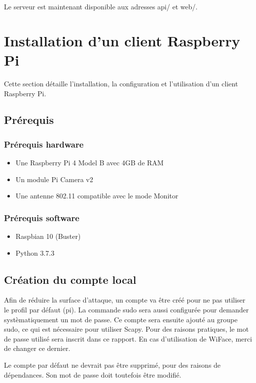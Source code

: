 Le serveur est maintenant disponible aux adresses api/ et web/.

\section{Installation d'un client Raspberry Pi}
Cette section détaille l'installation, la configuration et l'utilisation d'un client Raspberry Pi.

\subsection{Prérequis}

\subsubsection{Prérequis hardware}
\begin{itemize}
    \item Une Raspberry Pi 4 Model B avec 4GB de RAM
    \item Un module Pi Camera v2
    \item Une antenne 802.11 compatible avec le mode Monitor
\end{itemize}

\subsubsection{Prérequis software}
\begin{itemize}
    \item Raspbian 10 (Buster)
    \item Python 3.7.3
\end{itemize}

\subsection{Création du compte local}
Afin de réduire la surface d'attaque, un compte va être créé pour ne pas utiliser
le profil par défaut (pi).
La commande sudo sera aussi configurée pour demander systèmatiquement un mot de passe.
Ce compte sera ensuite ajouté au groupe sudo, ce qui est nécessaire pour utiliser Scapy.
Pour des raisons pratiques, le mot de passe utilisé sera inscrit dans ce rapport. En cas d'utilisation de WiFace, merci de changer ce dernier.

Le compte par défaut ne devrait pas être supprimé, pour des raisons
de dépendances. Son mot de passe doit toutefois être modifié.

